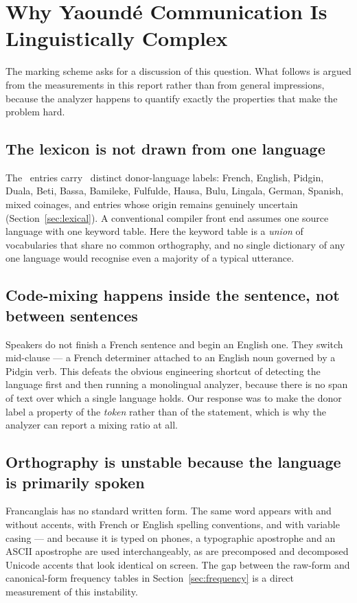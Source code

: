 \section{Why Yaound\'e Communication Is Linguistically Complex}\label{sec:complexity}

The marking scheme asks for a discussion of this question. What follows is argued from the
measurements in this report rather than from general impressions, because the analyzer
happens to quantify exactly the properties that make the problem hard.

\subsection{The lexicon is not drawn from one language}

The \LexiconTotal\ entries carry \OriginCount\ distinct donor-language labels: French,
English, Pidgin, Duala, Beti, Bassa, Bamileke, Fulfulde, Hausa, Bulu, Lingala, German,
Spanish, mixed coinages, and entries whose origin remains genuinely uncertain
(Section~\ref{sec:lexical}). A conventional compiler front end assumes one source language
with one keyword table. Here the keyword table is a \emph{union} of vocabularies that share
no common orthography, and no single dictionary of any one language would recognise even a
majority of a typical utterance.

\subsection{Code-mixing happens inside the sentence, not between sentences}

Speakers do not finish a French sentence and begin an English one. They switch
mid-clause --- a French determiner attached to an English noun governed by a Pidgin verb.
This defeats the obvious engineering shortcut of detecting the language first and then
running a monolingual analyzer, because there is no span of text over which a single
language holds. Our response was to make the donor label a property of the \emph{token}
rather than of the statement, which is why the analyzer can report a mixing ratio at all.

\subsection{Orthography is unstable because the language is primarily spoken}

Francanglais has no standard written form. The same word appears with and without accents,
with French or English spelling conventions, and with variable casing --- and because it is
typed on phones, a typographic apostrophe and an ASCII apostrophe are used
interchangeably, as are precomposed and decomposed Unicode accents that look identical on
screen. The gap between the raw-form and canonical-form frequency tables in
Section~\ref{sec:frequency} is a direct measurement of this instability.

